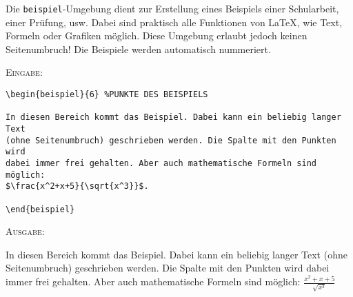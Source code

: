 \documentclass[a4paper,12pt]{article}
\begin{document}
Die \texttt{beispiel}-Umgebung dient zur Erstellung eines Beispiels einer Schularbeit, einer Prüfung, usw. Dabei sind praktisch alle Funktionen von \LaTeX, wie Text, Formeln oder Grafiken möglich. Diese Umgebung erlaubt jedoch keinen Seitenumbruch! Die Beispiele werden automatisch nummeriert.

\leer

\textsc{Eingabe:}
\begin{verbatim}
\begin{beispiel}{6} %PUNKTE DES BEISPIELS

In diesen Bereich kommt das Beispiel. Dabei kann ein beliebig langer Text
(ohne Seitenumbruch) geschrieben werden. Die Spalte mit den Punkten wird 
dabei immer frei gehalten. Aber auch mathematische Formeln sind möglich:
$\frac{x^2+x+5}{\sqrt{x^3}}$.

\end{beispiel}
\end{verbatim}

\leer

\textsc{Ausgabe:}\leer

\begin{beispiel}{6} %
In diesen Bereich kommt das Beispiel. Dabei kann ein beliebig langer Text
(ohne Seitenumbruch) geschrieben werden. Die Spalte mit den Punkten wird dabei 
immer frei gehalten. Aber auch mathematische Formeln sind möglich:
$\frac{x^2+x+5}{\sqrt{x^3}}$
\end{beispiel}
%
%
%
%
%
%
%
%
\end{document}
